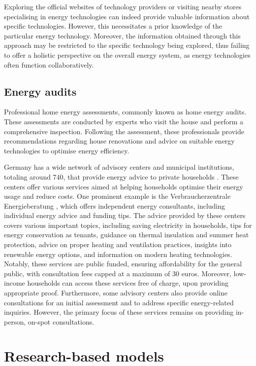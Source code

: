 Exploring the official websites of technology providers or visiting nearby stores specialising in energy technologies can indeed provide valuable information about specific technologies. 
However, this necessitates a prior knowledge of the particular energy technology.
Moreover, the information obtained through this approach may be restricted to the specific technology being explored, 
thus failing to offer a holistic perspective on the overall energy system, as energy technologies often function collaboratively.


\subsection{Energy audits}

Professional home energy assessments, commonly known as home energy audits.
These assessments are conducted by experts who visit the house and perform a comprehensive inspection. 
Following the assessment, these professionals provide recommendations regarding house renovations and advice on suitable energy technologies to optimise energy efficiency. 

Germany has a wide network of advisory centers and municipal institutions, totaling around 740, that provide energy advice to private households \cite{bmwk2023}. 
These centers offer various services aimed at helping households optimise their energy usage and reduce costs. 
One prominent example is the Verbraucherzentrale Energieberatung \cite{VB2023}, 
which offers independent energy consultants, including individual energy advice and funding tips. 
The advice provided by these centers covers various important topics, including saving electricity in households, tips for energy conservation as tenants, guidance on thermal insulation and summer heat protection, advice on proper heating and ventilation practices, insights into renewable energy options, and information on modern heating technologies.
Notably, these services are public funded, ensuring affordability for the general public, with consultation fees capped at a maximum of 30 euros. 
Moreover, low-income households can access these services free of charge, upon providing appropriate proof.
Furthermore, some advisory centers also provide online consultations for an initial assessment and to address specific energy-related inquiries. 
However, the primary focus of these services remains on providing in-person, on-spot consultations. 


\section{Research-based models}

